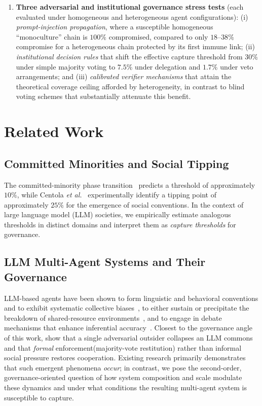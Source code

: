 \documentclass[manuscript,screen,review]{acmart}
\begin{document}
\begin{enumerate}
\item \textbf{Three adversarial and institutional governance stress tests} (each evaluated under homogeneous and heterogeneous agent configurations): (i) \emph{prompt-injection propagation}, where a susceptible homogeneous “monoculture” chain is $100\%$ compromised, compared to only $18$–$38\%$ compromise for a heterogeneous chain protected by its first immune link; (ii) \emph{institutional decision rules} that shift the effective capture threshold from $30\%$ under simple majority voting to $7.5\%$ under delegation and $1.7\%$ under veto arrangements; and (iii) \emph{calibrated verifier mechanisms} that attain the theoretical coverage ceiling afforded by heterogeneity, in contrast to blind voting schemes that substantially attenuate this benefit.
\end{enumerate}

\section{Related Work}
\subsection{Committed Minorities and Social Tipping}
The committed-minority phase transition~\cite{xie2011} predicts a threshold of approximately $10\%$, while Centola \emph{et al.}~\cite{centola2018} experimentally identify a tipping point of approximately $25\%$ for the emergence of social conventions. In the context of large language model (LLM) societies, we empirically estimate analogous thresholds in distinct domains and interpret them as \emph{capture thresholds} for governance.

\subsection{LLM Multi-Agent Systems and Their Governance}
LLM-based agents have been shown to form linguistic and behavioral conventions and to exhibit systematic collective biases~\cite{ashery2025}, to either sustain or precipitate the breakdown of shared-resource environments~\cite{piatti2024,hardin1968}, and to engage in debate mechanisms that enhance inferential accuracy~\cite{du2024debate}. Closest to the governance angle of this work, \citet{bell2026restitution} show that a single adversarial outsider collapses an LLM commons and that \emph{formal} enforcement(majority-vote restitution) rather than informal social pressure restores cooperation. Existing research primarily demonstrates that such emergent phenomena \emph{occur}; in contrast, we pose the second-order, governance-oriented question of how system composition and scale modulate these dynamics and under what conditions the resulting multi-agent system is susceptible to capture.
\end{document}
